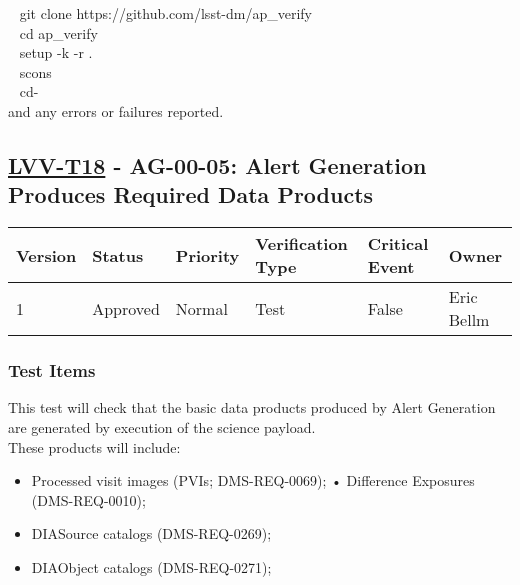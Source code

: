 \hspace*{0.333em} ~ git clone https://github.com/lsst-dm/ap\_verify\\
\hspace*{0.333em} ~ cd ap\_verify\\
\hspace*{0.333em} ~ setup -k -r .\\
\hspace*{0.333em} ~ scons\\
\hspace*{0.333em} ~ cd-\\[2\baselineskip]and any errors or failures
reported.\\[2\baselineskip]

\hypertarget{lvv-t18---ag-00-05-alert-generation-produces-required-data-products}{\subsection{\texorpdfstring{\href{https://jira.lsstcorp.org/secure/Tests.jspa\#/testCase/LVV-T18}{LVV-T18}
- AG-00-05: Alert Generation Produces Required Data
Products}{LVV-T18 - AG-00-05: Alert Generation Produces Required Data Products}}\label{lvv-t18---ag-00-05-alert-generation-produces-required-data-products}}

\begin{longtable}[]{@{}llllll@{}}
\toprule
Version & Status & Priority & Verification Type & Critical Event &
Owner\tabularnewline
\midrule
\endhead
1 & Approved & Normal & Test & False & Eric Bellm\tabularnewline
\bottomrule
\end{longtable}

\subsubsection{Test Items}\label{test-items-1}

This test will check that the basic data products produced by Alert
Generation are generated by execution of the science payload.\\
These products will include:

\begin{itemize}
\tightlist
\item
  Processed visit images (PVIs; DMS-REQ-0069); • Difference Exposures
  (DMS-REQ-0010);
\item
  DIASource catalogs (DMS-REQ-0269);
\item
  DIAObject catalogs (DMS-REQ-0271);
\end{itemize}

